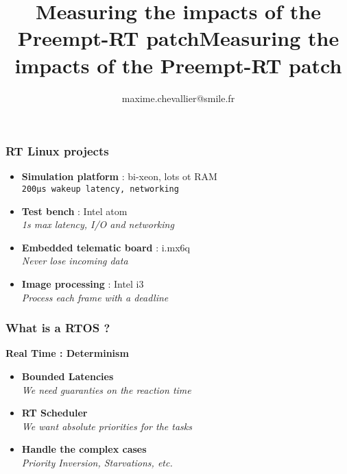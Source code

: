\documentclass{smilebeamer}
\title{Measuring the impacts of the Preempt-RT patch}
\author{maxime.chevallier@smile.fr}
\begin{document}
\begin{frame}[plain]
	\title{Measuring the impacts of the Preempt-RT patch}
    \titlepage
\end{frame}

\begin{frame}
	\frametitle{RT Linux projects}
		\begin{itemize}
			\item \textbf{Simulation platform} : bi-xeon, lots ot RAM \\ \small{\texttt{200µs wakeup latency, networking}}
			\vspace{0.3cm}
			\item \textbf{Test bench} : Intel atom \\ \small{\textit{1s max latency, I/O and networking}}
			\vspace{0.3cm}
			\item \textbf{Embedded telematic board} : i.mx6q \\ \small{\textit{Never lose incoming data}}
			\vspace{0.3cm}
			\item \textbf{Image processing} : Intel i3 \\ \small{\textit{Process each frame with a deadline}}
		\end{itemize}
\end{frame}

\begin{frame}
	\frametitle{What is a RTOS ?}

	\textbf{Real Time : Determinism}

	\begin{itemize}
		\item \textbf{Bounded Latencies} \\ \small{\textit{We need guaranties on the reaction time}}
			\vspace{0.3cm}
		\item \textbf{RT Scheduler} \\ \small{\textit{We want absolute priorities for the tasks}}
			\vspace{0.3cm}
		\item \textbf{Handle the complex cases} \\ \small{\textit{Priority Inversion, Starvations, etc.}}
	\end{itemize}

\end{frame}
\end{document}
